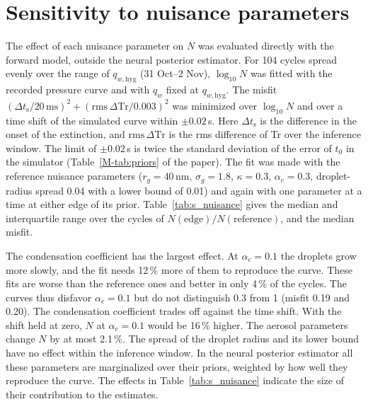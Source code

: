 \documentclass[12pt]{article}
\begin{document}
\section{Sensitivity to nuisance parameters}
\label{sec:s-nuisance}
The effect of each nuisance parameter on $N$ was evaluated directly with the forward model, outside
the neural posterior estimator. For 104 cycles spread evenly over the range of $q_{w,\mathrm{hyg}}$
(31 Oct--2 Nov), $\log_{10}N$ was fitted with the recorded pressure curve and with $q_w$ fixed at
$q_{w,\mathrm{hyg}}$.
The misfit $(\Delta t_\mathrm{s}/20\,\mathrm{ms})^2 + (\mathrm{rms}\,\Delta\mathrm{Tr}/0.003)^2$ was minimized
over $\log_{10}N$ and over a time shift of the simulated curve within $\pm0.02$\,s.
Here $\Delta t_\mathrm{s}$ is the difference in the onset of the extinction, and
$\mathrm{rms}\,\Delta\mathrm{Tr}$
is the rms difference of Tr over the inference window.
The limit of $\pm0.02$\,s is twice the standard deviation of the error of $t_0$ in the simulator
(Table~\ref{M-tab:priors} of the paper).
The fit was made with the reference nuisance parameters
($r_g = 40$\,nm, $\sigma_g = 1.8$, $\kappa = 0.3$, $\alpha_c = 0.3$, droplet-radius spread 0.04 with a
lower bound of 0.01) and again with one parameter at a time at either edge of its prior.
Table~\ref{tab:s_nuisance}
gives the median and interquartile range over the cycles of $N(\text{edge})/N(\text{reference})$, and the
median misfit.

\begin{table}[!htbp]
\centering
\caption{Sensitivity of $N$ to the nuisance parameters (104 cycles): ratio of the best-fit $N$ with one
parameter at an edge of its prior to that with the reference set, and median misfit.}
\label{tab:s_nuisance}
\small
\end{table}

The condensation coefficient has the largest effect. At $\alpha_c = 0.1$ the droplets grow more
slowly, and the fit needs 12\,\% more of them to reproduce the curve.
These fits are worse than the reference ones and better in only 4\,\% of the cycles.
The curves thus disfavor $\alpha_c = 0.1$ but do not distinguish 0.3 from 1 (misfit 0.19 and 0.20). The
condensation coefficient
trades off against the time shift. With the shift held at zero, $N$ at $\alpha_c = 0.1$ would be 16\,\%
higher. The aerosol parameters change $N$ by at most 2.1\,\%. The spread of the droplet radius and its lower
bound have no effect within the
inference window. In the neural posterior estimator all these parameters are marginalized over their
priors, weighted by how well they reproduce the curve. The effects in Table~\ref{tab:s_nuisance}
indicate the size of their contribution to the estimates.
\end{document}
